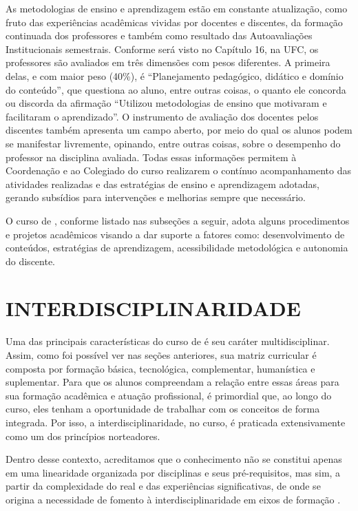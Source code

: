 As metodologias de ensino e aprendizagem estão em constante atualização, como fruto das experiências acadêmicas vividas por docentes e discentes, da formação continuada dos professores e também como resultado das Autoavaliações Institucionais semestrais. Conforme será visto no Capítulo 16, na UFC, os professores são avaliados em três dimensões com pesos diferentes. A primeira delas, e com maior peso (40\%), é “Planejamento pedagógico, didático e domínio do conteúdo”, que questiona ao aluno, entre outras coisas, o quanto ele concorda ou discorda da afirmação “Utilizou metodologias de ensino que motivaram e facilitaram o aprendizado”. O instrumento de avaliação dos docentes pelos discentes também apresenta um campo aberto, por meio do qual os alunos podem se manifestar livremente, opinando, entre outras coisas, sobre o desempenho do professor na disciplina avaliada. Todas essas informações permitem à Coordenação e ao Colegiado do curso realizarem o contínuo acompanhamento das atividades realizadas e das estratégias de ensino e aprendizagem adotadas, gerando subsídios para intervenções e melhorias sempre que necessário.

O curso de \nomedocurso, conforme listado nas subseções a seguir, adota alguns procedimentos e projetos acadêmicos visando a dar suporte a fatores como: desenvolvimento de conteúdos, estratégias de aprendizagem, acessibilidade metodológica e autonomia do discente.

\section{INTERDISCIPLINARIDADE}

Uma das principais características do curso de \nomedocurso é seu caráter multidisciplinar. Assim, como foi possível ver nas seções anteriores, sua matriz curricular é composta por formação básica, tecnológica, complementar, humanística e suplementar. Para que os alunos compreendam a relação entre essas áreas para sua formação acadêmica e atuação profissional, é primordial que, ao longo do curso, eles tenham a oportunidade de trabalhar com os conceitos de forma integrada. Por isso, a interdisciplinaridade, no curso, é praticada extensivamente como um dos princípios norteadores.

Dentro desse contexto, acreditamos que o conhecimento não se constitui apenas em uma linearidade organizada por disciplinas e seus pré-requisitos, mas sim, a partir da complexidade do real e das experiências significativas, de onde se origina a necessidade de fomento à interdisciplinaridade em eixos de formação \cite{pombo1993interdisciplinaridade}.


